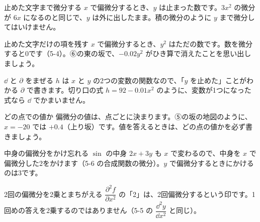 
\begin{tsumazuki}{止めた文字まで微分する}
$x$ で偏微分するとき、$y$ は止まった数です。$3x^2$ の微分が $6x$ になるのと同じで、$y$ は外に出したまま。積の微分のように $y$ まで微分してはいけません。
\end{tsumazuki}

\begin{tsumazuki}{止めた文字だけの項を残す}
$x$ で偏微分するとき、$y^2$ はただの数です。数を微分すると0です（5-4）。⑥の東の坂で、$-0.02y^2$ がひき算で消えたことを思い出しましょう。
\end{tsumazuki}

\begin{tsumazuki}{$\dd$ と $\partial$ をまぜる}
$h$ は $x$ と $y$ の2つの変数の関数なので、「$y$ を止めた」ことがわかる $\partial$ で書きます。切り口の式 $h=92-0.01x^2$ のように、変数が1つになった式なら $\dd$ でかまいません。
\end{tsumazuki}

\begin{tsumazuki}{どの点での値か}
偏微分の値は、点ごとに決まります。⑤の坂の地図のように、$x=-20$ では $+0.4$（上り坂）です。値を答えるときは、どの点の値かを必ず書きましょう。
\end{tsumazuki}

\begin{tsumazuki}{中身の偏微分をかけ忘れる}
$\sin$ の中身 $2x+3y$ も $x$ で変わるので、中身を $x$ で偏微分した2をかけます（5-6 の合成関数の微分）。$y$ で偏微分するときにかけるのは3です。
\end{tsumazuki}

\begin{tsumazuki}{2回の偏微分を2乗とまちがえる}
$\dfrac{\partial^2f}{\partial x^2}$ の「2」は、2回偏微分するという印です。1回めの答えを2乗するのではありません（5-5 の $\dfrac{\dd^2y}{\dd x^2}$ と同じ）。
\end{tsumazuki}

